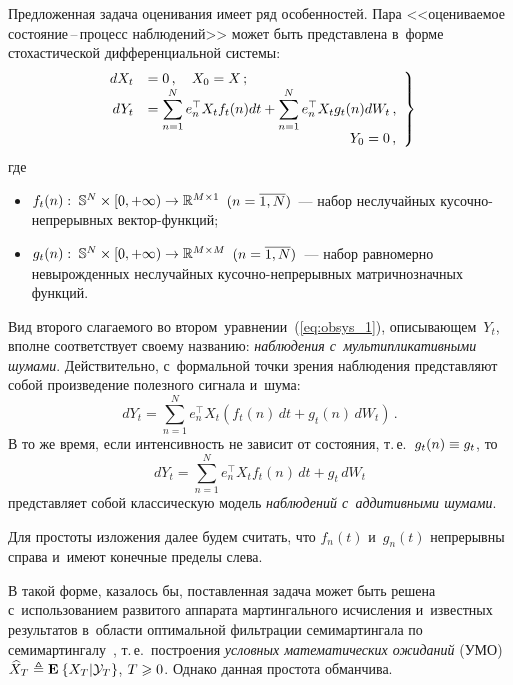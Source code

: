 \begin{multicols}{2}
Предложенная задача оценивания имеет ряд особенностей. Пара <<оцениваемое 
со\-сто\-яние\,--\,про\-цесс наблюдений>> может быть представлена в~форме 
стохастической дифференциальной сис\-темы:
\begin{equation}
\left.
\begin{array}{rl}
 \hspace*{-2mm}dX_t &= 0\,, \quad X_0 = X\,;\\
  \hspace*{-2mm}dY_t &= \displaystyle\sum\limits_{n=1}^Ne_n^{\top}X_t f_t(n)dt +  
 \sum\limits_{n=1}^Ne_n^{\top}X_tg_t(n)dW_t\,, \\
 &\hspace*{51mm} Y_0=0\,,
\end{array}
\right\}\!\!
\label{eq:obsys_1}
\end{equation}
где
  \begin{itemize}
  \item
  $f_t(n):\;\mathbb{S}^N \times [0,+\infty) \hm\to \mathbb{R}^{M \times 1}$ 
  $(n\hm=\overline{1,N})$~--- набор неслучайных ку\-соч\-но-не\-пре\-рыв\-ных век\-тор-функ\-ций;
  \item
  $g_t(n):\;\mathbb{S}^N \times [0,+\infty) \hm\to \mathbb{R}^{M \times M}$ 
  $(n\hm=\overline{1,N})$~--- набор равномерно невырожденных неслучайных 
  ку\-соч\-но-не\-пре\-рыв\-ных матричнозначных функций.
  \end{itemize}

Вид второго слагаемого во втором~уравнении~(\ref{eq:obsys_1}), описывающем~$Y_t$, 
вполне соответствует своему названию: \textit{наблюдения с~мультипликативными шумами}. 
Действительно, с~формальной точки зрения наблюдения представляют собой произведение 
полезного сигнала и~шума:
$$
dY_t = \sum\limits_{n=1}^Ne^{\top}_nX_t
\left( f_t(n)\,dt + g_t(n)\,dW_t\right)\,.
$$
 В то же время, если интенсивность не зависит от состояния, т.\,е.\
  $g_t(n) \hm\equiv g_t$, то
$$
dY_t = \sum\limits_{n=1}^Ne_n^{\top}X_t f_t(n)\,dt +  g_t\,dW_t
$$
представляет собой классическую модель \textit{наблюдений с~аддитивными шумами}.

Для простоты изложения далее будем считать, что $f_n(t)$ и~$g_n(t)$ непрерывны 
справа и~имеют конечные пределы слева.

В такой форме, казалось бы, поставленная задача может быть решена с~использованием 
развитого аппарата мартингального исчисления и~известных результатов в~области 
оптимальной фильтрации семимартингала по семимартингалу~\cite{LS_86}, т.\,е.\ 
построения \textit{условных математических ожиданий} (УМО)
 $\widehat{X}_T \triangleq\mathbf{E}_{  }\left\{ \mathop{X_T|\mathcal{Y}_T} \right\}$, $T \hm\geqslant 0$. 
 Однако данная простота обманчива.


\end{multicols}

